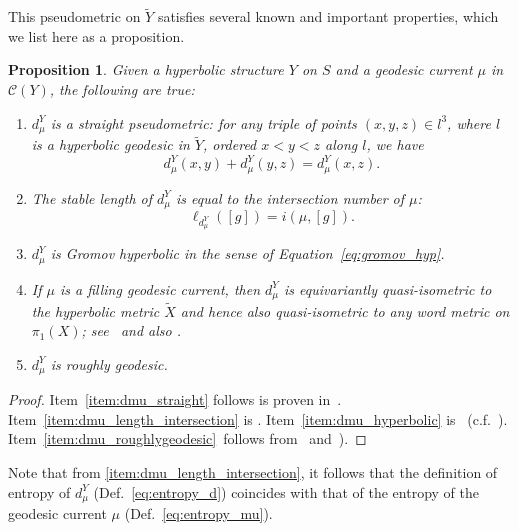 \documentclass[12pt]{amsart}
\numberwithin{equation}{section}
\numberwithin{figure}{section}
\newtheorem{proposition}[equation]{Proposition}
\theoremstyle{definition}
\theoremstyle{plain}
\newcommand*{\wt}[1]{\widetilde{#1}}
\begin{document}
This pseudometric on $\wt{Y}$ satisfies several known and important properties, which we list here as a proposition.


\begin{proposition}
\label{prop:dmu}
Given a hyperbolic structure $Y$ on $S$ and a geodesic current $\mu$ in $\mathcal{C}(Y)$, the following are true:
\begin{enumerate}[label=(\alph*),ref=\thetheorem~(\alph*)]
\item\label{item:dmu_straight}
$d_\mu^{Y}$ is a \emph{straight pseudometric}: for any triple of points
$(x,y,z) \in l^3$, where $l$ is a hyperbolic geodesic in $\wt{Y}$,
ordered $x<y<z$ along $l$, we have
\[
d_{\mu}^Y(x,y)+ d_{\mu}^Y(y,z)=d_{\mu}^Y(x,z).
\]

\item\label{item:dmu_length_intersection}
The stable length of $d_{\mu}^Y$ is equal to the \emph{intersection number}
of $\mu$:
\begin{equation}
\ell_{d_{\mu}^Y}([g])=i(\mu, [g]).
\end{equation}

\item\label{item:dmu_hyperbolic}
$d_{\mu}^{Y}$ is \emph{Gromov hyperbolic} in the sense of
Equation~\eqref{eq:gromov_hyp}.

\item\label{item:dmu_qi}
If $\mu$ is a filling geodesic current, then $d_{\mu}^{Y}$ is
\emph{equivariantly quasi-isometric} to the hyperbolic metric $\wt{X}$
 and hence also quasi-isometric to any word metric on
$\pi_1(X)$; see~\cite[Theorem~C]{DRMG23:Duals} and also
\cite[Theorem~1.11]{COR22:Manhattan}.

\item\label{item:dmu_roughlygeodesic}
$d_\mu^{Y}$ is \emph{roughly geodesic}.
\end{enumerate}
\end{proposition}
\begin{proof}
Item~\ref{item:dmu_straight} follows is proven in~\cite[Proposition~4.1]{BIPP21:Currents}.
Item~\ref{item:dmu_length_intersection} is \cite[Lemma~4.7]{BIPP21:Currents}.
Item~\ref{item:dmu_hyperbolic} is~\cite[Theorem~A]{DRMG23:Duals} (c.f.~\cite[Proposition~6.12]{CT25:Manhattan}).
Item~\ref{item:dmu_roughlygeodesic}~follows from~\cite[Lemma~3.2]{COR22:Manhattan} and~\cite[Lemma~6.12]{COR22:Manhattan}).
\end{proof}

Note that from \ref{item:dmu_length_intersection}, it follows that the definition of entropy of $d_\mu^{Y}$ (Def.~\ref{eq:entropy_d}) coincides with that of the entropy of the geodesic current $\mu$ (Def.~\ref{eq:entropy_mu}).
\end{document}
